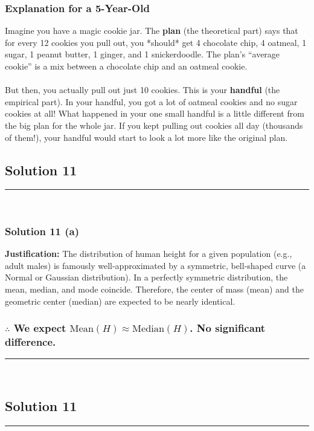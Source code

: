 \documentclass{article}
\begin{document}
\subsubsection*{\normalfont\bf{Explanation for a 5-Year-Old}}
\parbox{\textwidth}{Imagine you have a magic cookie jar. The \textbf{plan} (the theoretical part) says that for every 12 cookies you pull out, you *should* get 4 chocolate chip, 4 oatmeal, 1 sugar, 1 peanut butter, 1 ginger, and 1 snickerdoodle. The plan's ``average cookie'' is a mix between a chocolate chip and an oatmeal cookie. \\ \\ But then, you actually pull out just 10 cookies. This is your \textbf{handful} (the empirical part). In your handful, you got a lot of oatmeal cookies and no sugar cookies at all! What happened in your one small handful is a little different from the big plan for the whole jar. If you kept pulling out cookies all day (thousands of them!), your handful would start to look a lot more like the original plan.}

\newpage

\subsection*{Solution 11}
\noindent\rule{\textwidth}{0.4pt}\\
\subsubsection*{Solution  11 (a)}

\parbox{\textwidth}{
    \textbf{Justification:} The distribution of human height for a given population (e.g., adult males) is famously well-approximated by a symmetric, bell-shaped curve (a Normal or Gaussian distribution). In a perfectly symmetric distribution, the mean, median, and mode coincide. Therefore, the center of mass (mean) and the geometric center (median) are expected to be nearly identical.
}

\subsubsection*{\normalfont $\therefore$ We expect $\text{Mean}(H) \approx \text{Median}(H)$. No significant difference.}

\noindent\rule{\textwidth}{0.4pt}\\

\newpage

\subsection*{Solution 11}
\noindent\rule{\textwidth}{0.4pt}\\
\end{document}
